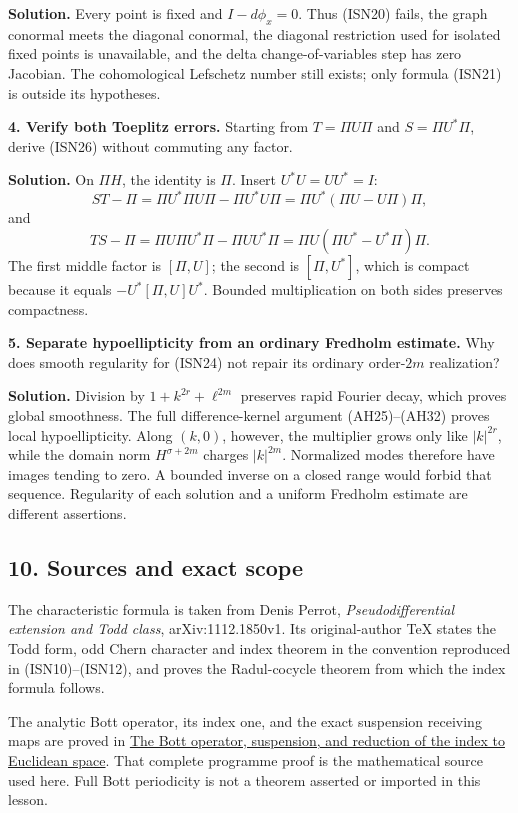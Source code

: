 \documentclass[
  11pt,
]{article}
\begin{document}
\textbf{Solution.} Every point is fixed and \(I-d\phi_x=0\). Thus
(ISN20) fails, the graph conormal meets the diagonal conormal, the
diagonal restriction used for isolated fixed points is unavailable, and
the delta change-of-variables step has zero Jacobian. The cohomological
Lefschetz number still exists; only formula (ISN21) is outside its
hypotheses.

\textbf{4. Verify both Toeplitz errors.} Starting from \(T=\Pi U\Pi\)
and \(S=\Pi U^*\Pi\), derive (ISN26) without commuting any factor.

\textbf{Solution.} On \(\Pi H\), the identity is \(\Pi\). Insert
\(U^*U=UU^*=I\): \[
 ST-\Pi
 =\Pi U^*\Pi U\Pi-\Pi U^*U\Pi
 =\Pi U^*(\Pi U-U\Pi)\Pi,
\] and \[
 TS-\Pi
 =\Pi U\Pi U^*\Pi-\Pi UU^*\Pi
 =\Pi U(\Pi U^*-U^*\Pi)\Pi.
\] The first middle factor is \([\Pi,U]\); the second is \([\Pi,U^*]\),
which is compact because it equals \(-U^*[\Pi,U]U^*\). Bounded
multiplication on both sides preserves compactness.

\textbf{5. Separate hypoellipticity from an ordinary Fredholm estimate.}
Why does smooth regularity for (ISN24) not repair its ordinary
order-\(2m\) realization?

\textbf{Solution.} Division by \(1+k^{2r}+\ell^{2m}\) preserves rapid
Fourier decay, which proves global smoothness. The full
difference-kernel argument (AH25)--(AH32) proves local hypoellipticity.
Along \((k,0)\), however, the multiplier grows only like \(|k|^{2r}\),
while the domain norm \(H^{\sigma+2m}\) charges \(|k|^{2m}\). Normalized
modes therefore have images tending to zero. A bounded inverse on a
closed range would forbid that sequence. Regularity of each solution and
a uniform Fredholm estimate are different assertions.

\subsection{10. Sources and exact scope}\label{sources-and-exact-scope}

The characteristic formula is taken from Denis Perrot,
\emph{Pseudodifferential extension and Todd class}, arXiv:1112.1850v1.
Its original-author TeX states the Todd form, odd Chern character and
index theorem in the convention reproduced in (ISN10)--(ISN12), and
proves the Radul-cocycle theorem from which the index formula follows.

The analytic Bott operator, its index one, and the exact suspension
receiving maps are proved in \href{bott-suspension.pdf}{The Bott
operator, suspension, and reduction of the index to Euclidean space}.
That complete programme proof is the mathematical source used here. Full
Bott periodicity is not a theorem asserted or imported in this lesson.
\end{document}
